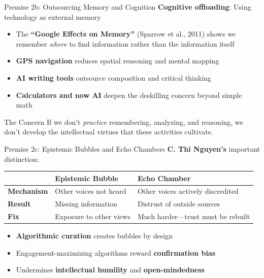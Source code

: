 ﻿\documentclass[aspectratio=169,11pt]{beamer}
\begin{document}
\begin{frame}{Premise 2b: Outsourcing Memory and Cognition}
\textbf{Cognitive offloading}: Using technology as external memory

\begin{itemize}
    \item The \textbf{``Google Effects on Memory''} (Sparrow et al., 2011) shows we remember \textit{where} to find information rather than the information itself
    \item \textbf{GPS navigation} reduces spatial reasoning and mental mapping
    \item \textbf{AI writing tools} outsource composition and critical thinking
    \item \textbf{Calculators and now AI} deepen the deskilling concern beyond simple math
\end{itemize}

\vspace{0.3cm}
\begin{alertblock}{The Concern}
If we don't \textit{practice} remembering, analyzing, and reasoning, we don't develop the intellectual virtues that these activities cultivate.
\end{alertblock}
\end{frame}

\begin{frame}{Premise 2c: Epistemic Bubbles and Echo Chambers}
\textbf{C. Thi Nguyen's} important distinction:

\begin{table}[h]
\centering
\small
\begin{tabular}{>{\bfseries}l p{4.5cm} p{4.5cm}}
\toprule
& \textbf{Epistemic Bubble} & \textbf{Echo Chamber} \\
\midrule
Mechanism & Other voices not heard & Other voices actively discredited \\
Result & Missing information & Distrust of outside sources \\
Fix & Exposure to other views & Much harder---trust must be rebuilt \\
\bottomrule
\end{tabular}
\end{table}

\vspace{0.2cm}
\begin{itemize}
    \item \textbf{Algorithmic curation} creates bubbles by design
    \item Engagement-maximizing algorithms reward \textbf{confirmation bias}
    \item Undermines \textbf{intellectual humility} and \textbf{open-mindedness}
\end{itemize}
\end{frame}
\end{document}
